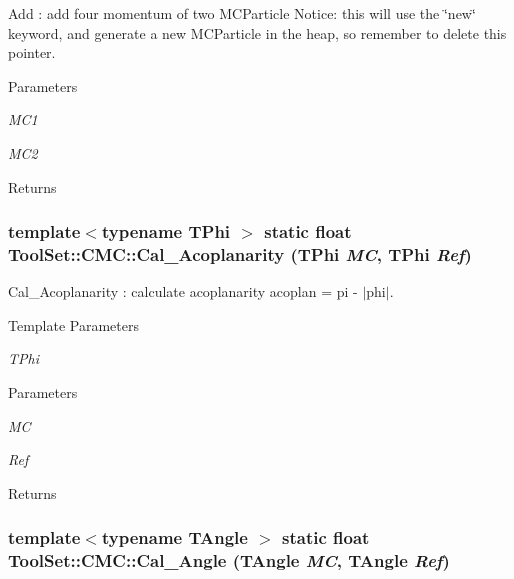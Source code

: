 Add : add four momentum of two MCParticle Notice: this will use the \char`\"{}new\char`\"{} keyword, and generate a new MCParticle in the heap, so remember to delete this pointer. 
\begin{DoxyParams}{Parameters}
\item[{\em MC1}]\item[{\em MC2}]\end{DoxyParams}
\begin{DoxyReturn}{Returns}

\end{DoxyReturn}
\hypertarget{classToolSet_1_1CMC_aa1667ca515e4b26ca43755fd8d2e30bd}{
\subsubsection[{Cal\_\-Acoplanarity}]{\setlength{\rightskip}{0pt plus 5cm}template$<$typename TPhi $>$ static float ToolSet::CMC::Cal\_\-Acoplanarity (TPhi {\em MC}, \/  TPhi {\em Ref})}}
\label{classToolSet_1_1CMC_aa1667ca515e4b26ca43755fd8d2e30bd}


Cal\_\-Acoplanarity : calculate acoplanarity acoplan = pi -\/ $|$phi$|$. 
\begin{DoxyTemplParams}{Template Parameters}
\item[{\em TPhi}]\end{DoxyTemplParams}

\begin{DoxyParams}{Parameters}
\item[{\em MC}]\item[{\em Ref}]\end{DoxyParams}
\begin{DoxyReturn}{Returns}

\end{DoxyReturn}
\hypertarget{classToolSet_1_1CMC_a0637a061bf4ecd9084b794023cc11816}{
\subsubsection[{Cal\_\-Angle}]{\setlength{\rightskip}{0pt plus 5cm}template$<$typename TAngle $>$ static float ToolSet::CMC::Cal\_\-Angle (TAngle {\em MC}, \/  TAngle {\em Ref})}}
\label{classToolSet_1_1CMC_a0637a061bf4ecd9084b794023cc11816}


